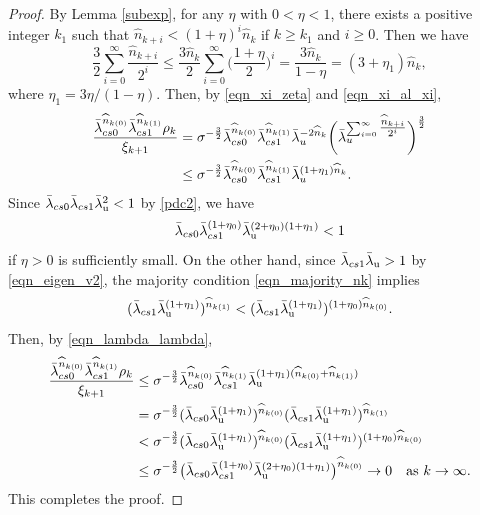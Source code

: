 \documentclass[10pt,a4paper]{amsart}
\begin{document}
\begin{proof}
By Lemma \ref{subexp},  for any $\eta$ with $0<\eta<1$, there exists a positive integer $k_1$ such that 
$\widehat n_{k+i}<(1+\eta)^i\widehat n_{k}$ if $k\geq k_1$ and $i\geq 0$.
Then we have 
$$
\frac{3}{2}\sum_{i=0}^{\infty}\frac{\widehat n_{k+i}}{2^{i}}
\leq 
\frac{3\widehat n_{k}}{2}\sum_{i=0}^{\infty}
\biggl(\frac{1+\eta}{2}\biggr)^{i}
=\frac{3\widehat n_{k}}{1-\eta}=(3+\eta_{1})\widehat n_{k},
$$
where $\eta_{1}=3\eta/(1-\eta)$.
Then, by \eqref{eqn_xi_zeta} and \eqref{eqn_xi_al_xi}, 
\begin{equation}\label{eqn_lambda_lambda}
\begin{split}
\frac{ \bar\lambda_{\rm cs0}^{\widehat n_{k(0)}}\bar\lambda_{\rm cs1}^{\widehat n_{k(1)}}\rho_{k}}
{\xi_{k+1}}
&=
\sigma^{-\frac{3}{2}} \bar\lambda_{\rm cs0}^{\widehat n_{k(0)}}\bar\lambda_{\rm cs1}^{\widehat n_{k(1)}} \bar{\lambda}_{\rm u}^{-2 \widehat n_{k}}
\biggl(\bar{\lambda}_{\rm u}^
{\sum_{i=0}^{\infty}\tfrac{\widehat n_{k+i}}{2^{i}}}
\biggr)^{\frac{3}{2}}\\
&\leq \sigma^{-\frac{3}{2}} \bar\lambda_{\rm cs0}^{\widehat n_{k(0)}}\bar\lambda_{\rm cs1}^{\widehat n_{k(1)}} \bar{\lambda}_{\rm u}^{(1+\eta_1)\widehat n_{k}}.
\end{split}
\end{equation}
Since 
$\bar\lambda_{\rm cs0}\bar\lambda_{\rm cs1}\bar\lambda_{\mathrm{u}}^{2}<1$ 
by \eqref{pdc2}, we have 
$$\bar\lambda_{\rm cs0}\bar\lambda_{\rm cs1}^{(1+\eta_0)}\bar\lambda_{\mathrm{u}}^{(2+\eta_0)(1+\eta_1)}<1$$
if $\eta>0$ is sufficiently small.
On the other hand, since $\bar\lambda_{\rm cs1}\bar\lambda_{\mathrm{u}}>1$ by \eqref{eqn_eigen_v2}, 
the majority condition \eqref{eqn_majority_nk} implies  
$$(\bar\lambda_{\rm cs1}\bar\lambda_{\mathrm{u}}^{(1+\eta_{1})})^{\widehat n_{k(1)}}
< (\bar\lambda_{\rm cs1}\bar\lambda_{\mathrm{u}}^{(1+\eta_{1})})^{(1+\eta_0)\widehat n_{k(0)}}.
$$
Then, by \eqref{eqn_lambda_lambda},   
\begin{align*}
\frac{\bar\lambda_{\rm cs0}^{\widehat n_{k(0)}}\bar\lambda_{\rm cs1}^{\widehat n_{k(1)}}\rho_{k}}{\xi_{k+1}}
&
\leq 
\sigma^{-\frac32} 
\bar\lambda_{\rm cs0}^{\widehat n_{k(0)}}
\bar\lambda_{\rm cs1}^{\widehat n_{k(1)}}
\bar\lambda_{\mathrm{u}}^{(1+\eta_{1})(\widehat n_{k(0)}+\widehat n_{k(1)})}\\
&= 
\sigma^{-\frac32}
(\bar\lambda_{\rm cs0}\bar\lambda_{\mathrm{u}}^{(1+\eta_{1})})^{\widehat n_{k(0)}}(\bar\lambda_{\rm cs1}\bar\lambda_{\mathrm{u}}^{(1+\eta_{1})})^{\widehat n_{k(1)}}\\
&<
\sigma^{-\frac32}
(\bar\lambda_{\rm cs0}\bar\lambda_{\mathrm{u}}^{(1+\eta_{1})})^{\widehat n_{k(0)}}(\bar\lambda_{\rm cs1}\bar\lambda_{\mathrm{u}}^{(1+\eta_{1})})^{(1+\eta_0)\widehat n_{k(0)}}\\
&\leq 
\sigma^{-\frac32}
\bigl(\bar\lambda_{\rm cs0}\bar\lambda_{\rm cs1}^{(1+\eta_0)}\bar\lambda_{\mathrm{u}}^{(2+\eta_0)(1+\eta_{1})}\bigr)^{\widehat n_{k(0)}}\rightarrow 0\quad\text{as $k\rightarrow \infty$}.
\end{align*}
This completes the proof.
\end{proof}
\end{document}
